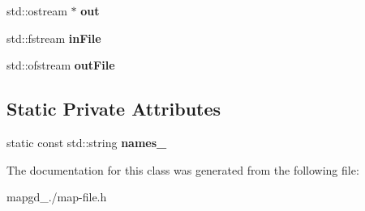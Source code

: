 \begin{DoxyCompactItemize}
\item 
\hypertarget{classgcf__file_a43f3c94d4edf2e167392a9673bf16952}{std\-::ostream $\ast$ {\bfseries out}}\label{classgcf__file_a43f3c94d4edf2e167392a9673bf16952}

\item 
\hypertarget{classgcf__file_a08bcdaedf76dc88d3f637d51619d9461}{std\-::fstream {\bfseries in\-File}}\label{classgcf__file_a08bcdaedf76dc88d3f637d51619d9461}

\item 
\hypertarget{classgcf__file_ae060f28f25f7cd78837d59d58de02a1c}{std\-::ofstream {\bfseries out\-File}}\label{classgcf__file_ae060f28f25f7cd78837d59d58de02a1c}

\end{DoxyCompactItemize}
\subsection*{Static Private Attributes}
\begin{DoxyCompactItemize}
\item 
\hypertarget{classgcf__file_a5ebf91fab56df50e192e37c730b94382}{static const std\-::string {\bfseries names\-\_\-}}\label{classgcf__file_a5ebf91fab56df50e192e37c730b94382}

\end{DoxyCompactItemize}


The documentation for this class was generated from the following file\-:\begin{DoxyCompactItemize}
\item 
mapgd\-\_./map-\/file.\-h\end{DoxyCompactItemize}
